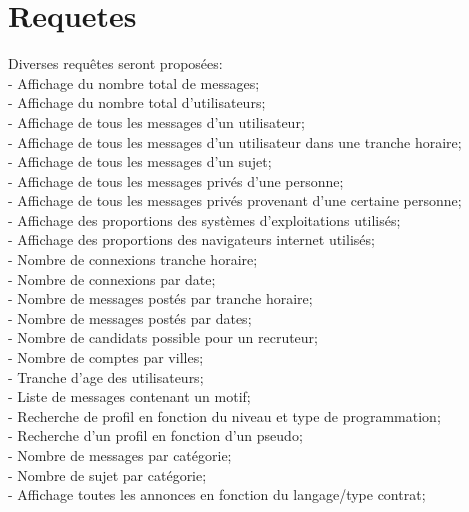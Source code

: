 \documentclass{report}
\begin{document}
\section{Requetes}
Diverses requêtes seront proposées:\\
 - Affichage du nombre total de messages;\\
 - Affichage du nombre total d’utilisateurs;\\
 - Affichage de tous les messages d'un utilisateur;\\
 - Affichage de tous les messages d'un utilisateur dans une tranche horaire;\\
 - Affichage de tous les messages d'un sujet;\\
 - Affichage de tous les messages privés d'une personne;\\
 - Affichage de tous les messages privés provenant d'une certaine personne;\\
 - Affichage des proportions des systèmes d'exploitations utilisés;\\
 - Affichage des proportions des navigateurs internet utilisés;\\
 - Nombre de connexions tranche horaire;\\
 - Nombre de connexions par date;\\
 - Nombre de messages postés par tranche horaire;\\
 - Nombre de messages postés par dates;\\
 - Nombre de candidats possible pour un recruteur;\\
 - Nombre de comptes par villes;\\
 - Tranche d’age des utilisateurs;\\
 - Liste de messages contenant un motif;\\
 - Recherche de profil en fonction du niveau et type de programmation;\\
 - Recherche d'un profil en fonction d'un pseudo;\\
 - Nombre de messages par catégorie;\\
 - Nombre de sujet par catégorie;\\
 - Affichage toutes les annonces en fonction du langage/type contrat;\\
\end{document}
